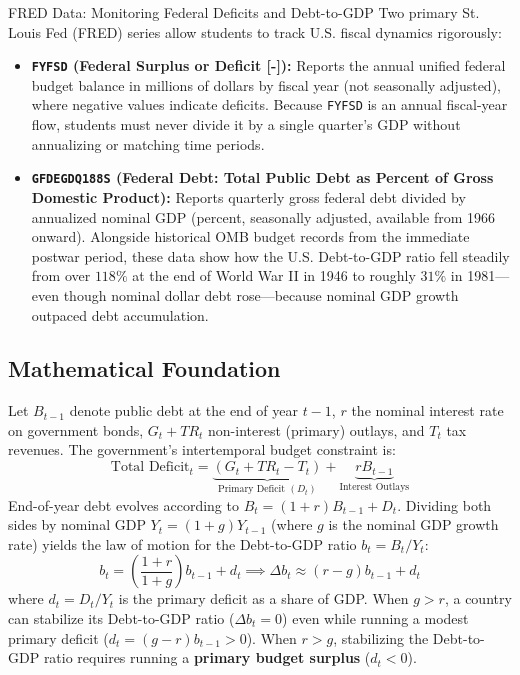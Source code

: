 \documentclass[11pt,letterpaper]{article}
\begin{document}
\begin{examplecase}{FRED Data: Monitoring Federal Deficits and Debt-to-GDP}
Two primary St. Louis Fed (FRED) series allow students to track U.S. fiscal dynamics rigorously:
\begin{itemize}
    \item \textbf{\texttt{FYFSD} (Federal Surplus or Deficit [-]):} Reports the annual unified federal budget balance in millions of dollars by fiscal year (not seasonally adjusted), where negative values indicate deficits. Because \texttt{FYFSD} is an annual fiscal-year flow, students must never divide it by a single quarter's GDP without annualizing or matching time periods.
    \item \textbf{\texttt{GFDEGDQ188S} (Federal Debt: Total Public Debt as Percent of Gross Domestic Product):} Reports quarterly gross federal debt divided by annualized nominal GDP (percent, seasonally adjusted, available from 1966 onward). Alongside historical OMB budget records from the immediate postwar period, these data show how the U.S. Debt-to-GDP ratio fell steadily from over $118\%$ at the end of World War II in 1946 to roughly $31\%$ in 1981---even though nominal dollar debt rose---because nominal GDP growth outpaced debt accumulation.
\end{itemize}
\end{examplecase}

\subsection*{Mathematical Foundation}
Let $B_{t-1}$ denote public debt at the end of year $t-1$, $r$ the nominal interest rate on government bonds, $G_t + TR_t$ non-interest (primary) outlays, and $T_t$ tax revenues. The government's intertemporal budget constraint is:
\begin{equation}
\text{Total Deficit}_t = \underbrace{(G_t + TR_t - T_t)}_{\text{Primary Deficit } (D_t)} + \underbrace{r B_{t-1}}_{\text{Interest Outlays}}
\end{equation}
End-of-year debt evolves according to $B_t = (1 + r)B_{t-1} + D_t$. Dividing both sides by nominal GDP $Y_t = (1 + g)Y_{t-1}$ (where $g$ is the nominal GDP growth rate) yields the law of motion for the Debt-to-GDP ratio $b_t = B_t / Y_t$:
\begin{equation}
b_t = \left(\frac{1 + r}{1 + g}\right) b_{t-1} + d_t \implies \Delta b_t \approx (r - g)b_{t-1} + d_t
\end{equation}
where $d_t = D_t / Y_t$ is the primary deficit as a share of GDP. When $g > r$, a country can stabilize its Debt-to-GDP ratio ($\Delta b_t = 0$) even while running a modest primary deficit ($d_t = (g - r)b_{t-1} > 0$). When $r > g$, stabilizing the Debt-to-GDP ratio requires running a \textbf{primary budget surplus} ($d_t < 0$).
\end{document}
